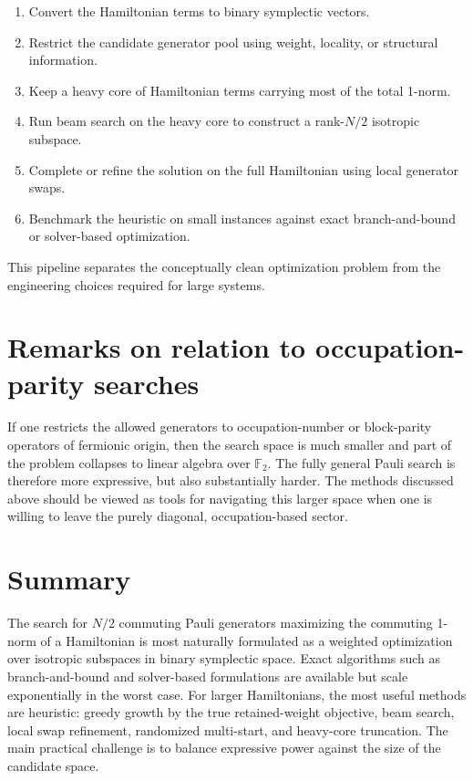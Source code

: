 \documentclass[11pt]{article}
\newcommand{\F}{\mathbb{F}_2}
\begin{document}
\begin{enumerate}[label=\arabic*.]
  \item Convert the Hamiltonian terms to binary symplectic vectors.
  \item Restrict the candidate generator pool using weight, locality, or structural information.
  \item Keep a heavy core of Hamiltonian terms carrying most of the total 1-norm.
  \item Run beam search on the heavy core to construct a rank-$N/2$ isotropic subspace.
  \item Complete or refine the solution on the full Hamiltonian using local generator swaps.
  \item Benchmark the heuristic on small instances against exact branch-and-bound or solver-based optimization.
\end{enumerate}

This pipeline separates the conceptually clean optimization problem from the engineering choices required for large systems.

\section{Remarks on relation to occupation-parity searches}
If one restricts the allowed generators to occupation-number or block-parity operators of fermionic origin, then the search space is much smaller and part of the problem collapses to linear algebra over $\F$. The fully general Pauli search is therefore more expressive, but also substantially harder. The methods discussed above should be viewed as tools for navigating this larger space when one is willing to leave the purely diagonal, occupation-based sector.

\section{Summary}
The search for $N/2$ commuting Pauli generators maximizing the commuting 1-norm of a Hamiltonian is most naturally formulated as a weighted optimization over isotropic subspaces in binary symplectic space. Exact algorithms such as branch-and-bound and solver-based formulations are available but scale exponentially in the worst case. For larger Hamiltonians, the most useful methods are heuristic: greedy growth by the true retained-weight objective, beam search, local swap refinement, randomized multi-start, and heavy-core truncation. The main practical challenge is to balance expressive power against the size of the candidate space.
\end{document}
